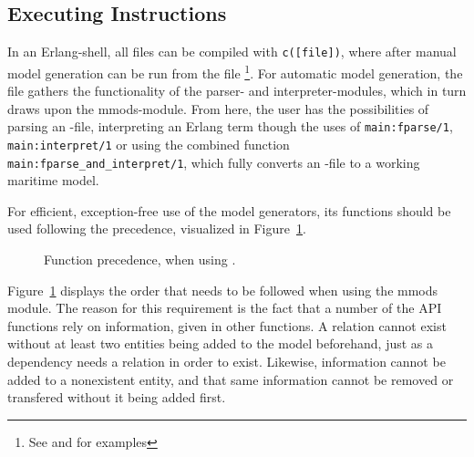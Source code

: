 \subsection{Executing Instructions}
In an Erlang-shell, all files can be compiled with \lstinline{c([file])}, where after manual model generation can be run from the  file \footnote{See  and  for examples}.
For automatic model generation, the  file gathers the functionality of the parser- and interpreter-modules, which in turn draws upon the mmods-module. From here, the user has the possibilities of parsing an -file, interpreting an Erlang term though the uses of \lstinline{main:fparse/1}, \lstinline{main:interpret/1} or using the combined function \lstinline{main:fparse_and_interpret/1}, which fully converts an -file to a working maritime model.

For efficient, exception-free use of the model generators, its functions should be used following the precedence, visualized in Figure~\ref{fig:mmodsPrec}.

\begin{figure}[h]
  \centering
  \caption{Function precedence, when using .}
  \label{fig:mmodsPrec}
\end{figure}

Figure~\ref{fig:mmodsPrec} displays the order that needs to be followed when using the mmods module. The reason for this requirement is the fact that a number of the API functions rely on information, given in other functions.
A relation cannot exist without at least two entities being added to the model beforehand, just as a dependency needs a relation in order to exist. Likewise, information cannot be added to a nonexistent entity, and that same information cannot be removed or transfered without it being added first.


